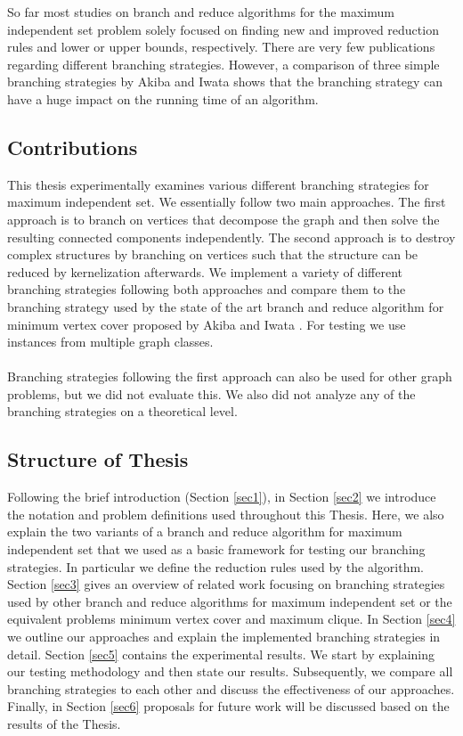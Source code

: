 \documentclass[]{article}
\begin{document}
So far most studies on branch and reduce algorithms for the maximum independent set problem solely focused on finding new and improved reduction rules and lower or upper bounds, respectively. There are very few publications regarding different branching strategies. However, a comparison of three simple branching strategies by Akiba and Iwata \cite{AkibaIwata} shows that the branching strategy can have a huge impact on the running time of an algorithm.

\subsection{Contributions}

This thesis experimentally examines various different branching strategies for maximum independent set. We essentially follow two main approaches. The first approach is to branch on vertices that decompose the graph and then solve the resulting connected components independently. The second approach is to destroy complex structures by branching on vertices such that the structure can be reduced by kernelization afterwards. We implement a variety of different branching strategies following both approaches and compare them to the branching strategy used by the state of the art branch and reduce algorithm for minimum vertex cover proposed by Akiba and Iwata \cite{AkibaIwata}. For testing we use instances from multiple graph classes.\paragraph{}
Branching strategies following the first approach can also be used for other graph problems, but we did not evaluate this. We also did not analyze any of the branching strategies on a theoretical level.  



\subsection{Structure of Thesis}

Following the brief introduction (Section \ref{sec1}), in Section \ref{sec2} we introduce the notation and problem definitions used throughout this Thesis. Here, we also explain the two variants of a branch and reduce algorithm for maximum independent set that we used as a basic framework for testing our branching strategies. In particular we define the reduction rules used by the algorithm.\\
Section \ref{sec3} gives an overview of related work focusing on branching strategies used by other branch and reduce algorithms for maximum independent set or the equivalent problems minimum vertex cover and maximum clique.
In Section \ref{sec4} we outline our approaches and explain the implemented branching strategies in detail. Section \ref{sec5} contains the experimental results. We start by explaining our testing methodology and then state our results. Subsequently, we compare all branching strategies to each other and discuss the effectiveness of our approaches. Finally, in Section \ref{sec6} proposals for future work will be discussed based on the results of the Thesis.
\end{document}
